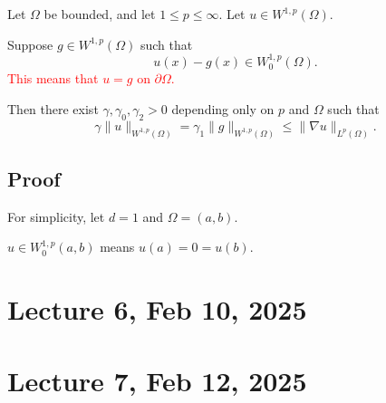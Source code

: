 \documentclass[12pt]{report}
\begin{document}
Let $\Omega$ be bounded, and let $1 \leq p \leq \infty$. Let $u \in W^{1,p}(\Omega)$. 

Suppose $g \in W^{1,p}(\Omega)$ such that
\[
u(x) - g(x) \in W^{1,p}_0(\Omega).
\]
\textcolor{red}{This means that $u = g$ on $\partial \Omega$.}

Then there exist $\gamma, \gamma_0, \gamma_2 > 0$ depending only on $p$ and $\Omega$ such that
\[
\gamma \| u \|_{W^{1,p}(\Omega)} = \gamma_1 \| g \|_{W^{1,p}(\Omega)} \leq \| \nabla u \|_{L^p(\Omega)}.
\]

\subsection{Proof}

For simplicity, let $d = 1$ and $\Omega = (a,b)$. 

$u \in W^{1,p}_0(a,b)$ means $u(a) = 0 = u(b)$. 
\section{Lecture 6, Feb 10, 2025}

\section{Lecture 7, Feb 12, 2025}
\end{document}
